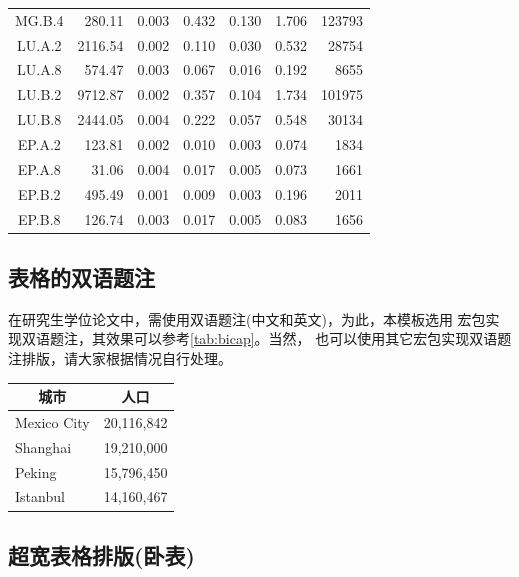 \begin{longtable}[c]{c*{6}{r}}
  MG.B.4 & 280.11 & 0.003 & 0.432 & 0.130 & 1.706 & 123793 \\
  LU.A.2 & 2116.54 & 0.002 & 0.110 & 0.030 & 0.532 & 28754 \\
  LU.A.8 & 574.47 & 0.003 & 0.067 & 0.016 & 0.192 & 8655 \\
  LU.B.2 & 9712.87 & 0.002 & 0.357 & 0.104 & 1.734 & 101975 \\
  LU.B.8 & 2444.05 & 0.004 & 0.222 & 0.057 & 0.548 & 30134 \\
  EP.A.2 & 123.81 & 0.002 & 0.010 & 0.003 & 0.074 & 1834 \\
  EP.A.8 & 31.06 & 0.004 & 0.017 & 0.005 & 0.073 & 1661 \\
  EP.B.2 & 495.49 & 0.001 & 0.009 & 0.003 & 0.196 & 2011 \\
  EP.B.8 & 126.74 & 0.003 & 0.017 & 0.005 & 0.083 & 1656 \\
  \bottomrule
\end{longtable}

\subsection{表格的双语题注}

在研究生学位论文中，需使用双语题注(中文和英文)，为此，本模板选用
宏包实现双语题注，其效果可以参考\ref{tab:bicap}。当然，
也可以使用其它宏包实现双语题注排版，请大家根据情况自行处理。

\begin{table}[htb]
  \centering
  \begin{tabular}{lr}
    \toprule
    \multicolumn{1}{c}{城市} & \multicolumn{1}{c}{人口} \\
    \midrule
    Mexico City              & 20,116,842               \\
    Shanghai                 & 19,210,000               \\
    Peking                   & 15,796,450               \\
    Istanbul                 & 14,160,467               \\
    \bottomrule
  \end{tabular}
\end{table}

\subsection{超宽表格排版(卧表)}

